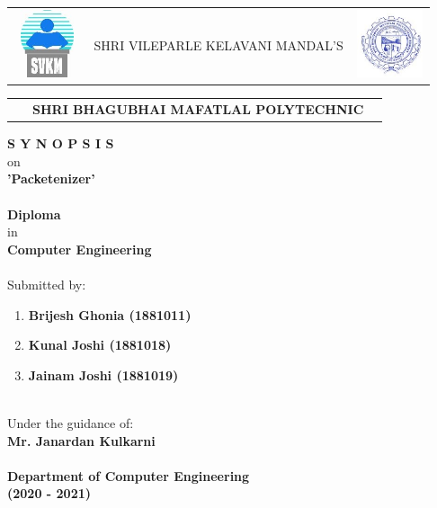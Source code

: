 \begin{titlepage}
	\begin{center}
		\begin{table}[h]
			\begin{tabular}{lll}
				\includegraphics[width=2cm,height=2cm]{media/svkm.jpeg}
				& \large{SHRI VILEPARLE KELAVANI MANDAL'S} &
				\includegraphics[width=2cm,height=2cm]{media/sbmp.jpeg}
				\\
			\end{tabular}
			\begin{tabular}{lll}
				\ & \Large \textbf {SHRI BHAGUBHAI MAFATLAL POLYTECHNIC}
			\end{tabular}
		\end{table}
	\Large \textbf {S Y N O P S I S} 
	\\ {on} \\
	\textbf{\large{'Packetenizer'}} \\ \ \\
	\large \textbf {Diploma} \\
	in \\
	\large \textbf {Computer Engineering}
	\\ \ \\
	\large {Submitted by:} \\
	\begin{enumerate}
		\centering
		\item \textbf {Brijesh Ghonia (1881011)}
		\item \textbf {Kunal Joshi (1881018)}
		\item \textbf {Jainam Joshi (1881019)}
	\end{enumerate} \ \\
	{Under the guidance of:} \\
	\textbf {Mr. Janardan Kulkarni}
	\\ \ \\
	\Large \textbf {Department of Computer Engineering} \\
	\textbf {(2020 - 2021)}
	\end{center}
\end{titlepage}